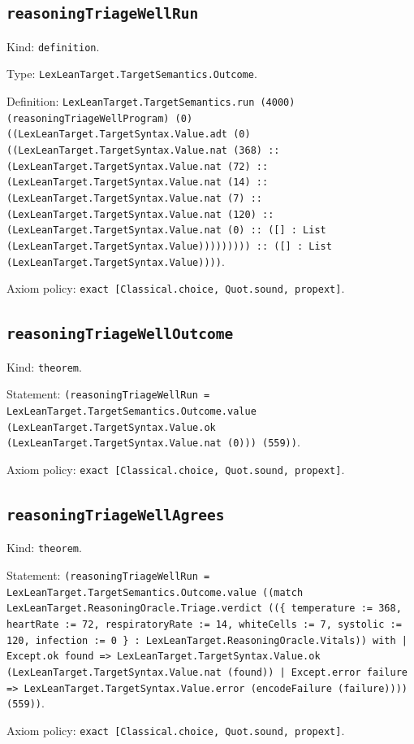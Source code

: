 \documentclass[11pt]{article}
\begin{document}
\subsection*{\texttt{reasoningTriageWellRun}}
\noindent Kind: \texttt{definition}.\par
\noindent Type: \texttt{LexLeanTarget.TargetSemantics.Outcome}.\par
\noindent Definition: \texttt{LexLeanTarget.TargetSemantics.run (4000) (reasoningTriageWellProgram) (0) ((LexLeanTarget.TargetSyntax.Value.adt (0) ((LexLeanTarget.TargetSyntax.Value.nat (368) :: (LexLeanTarget.TargetSyntax.Value.nat (72) :: (LexLeanTarget.TargetSyntax.Value.nat (14) :: (LexLeanTarget.TargetSyntax.Value.nat (7) :: (LexLeanTarget.TargetSyntax.Value.nat (120) :: (LexLeanTarget.TargetSyntax.Value.nat (0) :: ([] : List (LexLeanTarget.TargetSyntax.Value))))))))) :: ([] : List (LexLeanTarget.TargetSyntax.Value))))}.\par
\noindent Axiom policy: \texttt{exact [Classical.choice, Quot.sound, propext]}.\par
\subsection*{\texttt{reasoningTriageWellOutcome}}
\noindent Kind: \texttt{theorem}.\par
\noindent Statement: \texttt{(reasoningTriageWellRun = LexLeanTarget.TargetSemantics.Outcome.value (LexLeanTarget.TargetSyntax.Value.ok (LexLeanTarget.TargetSyntax.Value.nat (0))) (559))}.\par
\noindent Axiom policy: \texttt{exact [Classical.choice, Quot.sound, propext]}.\par
\subsection*{\texttt{reasoningTriageWellAgrees}}
\noindent Kind: \texttt{theorem}.\par
\noindent Statement: \texttt{(reasoningTriageWellRun = LexLeanTarget.TargetSemantics.Outcome.value ((match LexLeanTarget.ReasoningOracle.Triage.verdict ((\{ temperature := 368, heartRate := 72, respiratoryRate := 14, whiteCells := 7, systolic := 120, infection := 0 \} : LexLeanTarget.ReasoningOracle.Vitals)) with | Except.ok found => LexLeanTarget.TargetSyntax.Value.ok (LexLeanTarget.TargetSyntax.Value.nat (found)) | Except.error failure => LexLeanTarget.TargetSyntax.Value.error (encodeFailure (failure)))) (559))}.\par
\noindent Axiom policy: \texttt{exact [Classical.choice, Quot.sound, propext]}.\par
\end{document}
